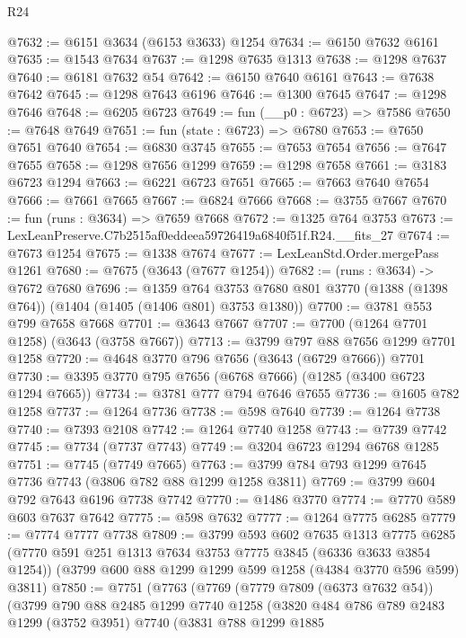 \begin{lexlean}{R24}
\begin{coremodule}
@7632 := @6151 @3634 (@6153 @3633) @1254
@7634 := @6150 @7632 @6161
@7635 := @1543 @7634
@7637 := @1298 @7635 @1313
@7638 := @1298 @7637
@7640 := @6181 @7632 @54
@7642 := @6150 @7640 @6161
@7643 := @7638 @7642
@7645 := @1298 @7643 @6196
@7646 := @1300 @7645
@7647 := @1298 @7646
@7648 := @6205 @6723
@7649 := fun (__p0 : @6723) => @7586
@7650 := @7648 @7649
@7651 := fun (state : @6723) => @6780
@7653 := @7650 @7651 @7640
@7654 := @6830 @3745
@7655 := @7653 @7654
@7656 := @7647 @7655
@7658 := @1298 @7656 @1299
@7659 := @1298 @7658
@7661 := @3183 @6723 @1294
@7663 := @6221 @6723 @7651
@7665 := @7663 @7640 @7654
@7666 := @7661 @7665
@7667 := @6824 @7666
@7668 := @3755 @7667
@7670 := fun (runs : @3634) => @7659 @7668
@7672 := @1325 @764 @3753
@7673 := LexLeanPreserve.C7b2515af0eddeea59726419a6840f51f.R24.__fits_27
@7674 := @7673 @1254
@7675 := @1338 @7674
@7677 := LexLeanStd.Order.mergePass @1261
@7680 := @7675 (@3643 (@7677 @1254))
@7682 := (runs : @3634) -> @7672 @7680
@7696 := @1359
    @764
    @3753
    @7680
    @801
    @3770
    (@1388 (@1398 @764))
    (@1404 (@1405 (@1406 @801) @3753 @1380))
@7700 := @3781 @553 @799 @7658 @7668
@7701 := @3643 @7667
@7707 := @7700 (@1264 @7701 @1258) (@3643 (@3758 @7667))
@7713 := @3799 @797 @88 @7656 @1299 @7701 @1258
@7720 := @4648 @3770 @796 @7656 (@3643 (@6729 @7666)) @7701
@7730 := @3395 @3770 @795 @7656 (@6768 @7666) (@1285 (@3400 @6723 @1294 @7665))
@7734 := @3781 @777 @794 @7646 @7655
@7736 := @1605 @782 @1258
@7737 := @1264 @7736
@7738 := @598 @7640
@7739 := @1264 @7738
@7740 := @7393 @2108
@7742 := @1264 @7740 @1258
@7743 := @7739 @7742
@7745 := @7734 (@7737 @7743)
@7749 := @3204 @6723 @1294 @6768 @1285
@7751 := @7745 (@7749 @7665)
@7763 := @3799 @784 @793 @1299 @7645 @7736 @7743 (@3806 @782 @88 @1299 @1258 @3811)
@7769 := @3799 @604 @792 @7643 @6196 @7738 @7742
@7770 := @1486 @3770
@7774 := @7770 @589 @603 @7637 @7642
@7775 := @598 @7632
@7777 := @1264 @7775 @6285
@7779 := @7774 @7777 @7738
@7809 := @3799
    @593
    @602
    @7635
    @1313
    @7775
    @6285
    (@7770 @591 @251 @1313 @7634 @3753 @7775 @3845 (@6336 @3633 @3854 @1254))
    (@3799 @600 @88 @1299 @1299 @599 @1258 (@4384 @3770 @596 @599) @3811)
@7850 := @7751
    (@7763
      (@7769
        (@7779 @7809 (@6373 @7632 @54))
        (@3799
          @790
          @88
          @2485
          @1299
          @7740
          @1258
          (@3820
            @484
            @786
            @789
            @2483
            @1299
            (@3752 @3951)
            @7740
            (@3831
              @788
              @1299
              @1885

\end{coremodule}
\end{lexlean}
